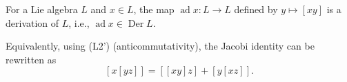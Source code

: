 For a Lie algebra $L$ and $x \in L$, the map $\operatorname{ad} x: L \to L$ defined by $y \mapsto [xy]$ is a derivation of $L$, i.e., $\operatorname{ad} x \in \operatorname{Der} L$.

Equivalently, using (L2') (anticommutativity), the Jacobi identity can be rewritten as
$$[x[yz]] = [[xy]z] + [y[xz]].$$
